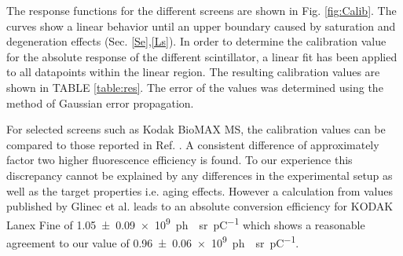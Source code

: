\documentclass[%
preprint,
amsmath,
amssymb,
aip,
rsi, 
numerical,
floatfix,
]{revtex4-1}
\newcommand{\myCite}[1]{\textcolor{blue}{\cite{#1}}}
\newcommand{\myOnlineCite}[1]{\textcolor{blue}{\onlinecite{#1}}}
\begin{document}


The response functions for the different screens are shown in Fig. \ref{fig:Calib}.
The curves show a linear behavior until an upper boundary caused by saturation and degeneration effects (Sec. \ref{Se},\ref{Ls}).  
In order to determine the calibration value for the absolute response of the different scintillator, a linear fit has been applied to all datapoints within the linear region.
The resulting calibration values are shown in TABLE \ref{table:res}. 
The error of the values was determined using the method of Gaussian error propagation.

For selected screens such as Kodak BioMAX MS, the calibration values can be compared to those reported in Ref. \myOnlineCite{Buck2010}.
A consistent difference of approximately factor two higher fluorescence efficiency is found.
To our experience this discrepancy cannot be explained by any differences in the experimental setup as well as the target properties i.e. aging effects.
However a calculation from values published by Glinec et al.\myCite{Glinec2006} leads to an absolute conversion efficiency for KODAK Lanex Fine of \SI[separate-uncertainty = true]{1.05(9)e9}{ph \per \steradian \per \pico \coulomb} which shows a reasonable agreement to our value of \SI[separate-uncertainty = true]{0.96(6)e9}{ph \per \steradian \per \pico \coulomb}. 
   
\end{document}

